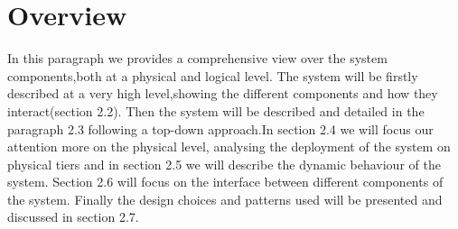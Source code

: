 \section{Overview}
In this paragraph we provides a comprehensive view over the system components,both at a physical and logical level.
The system will be firstly described at a very high level,showing the different components and how they interact(section 2.2). Then the system will be described and detailed in the paragraph 2.3 following a top-down approach.In section 2.4 we will focus our attention more on the physical level, analysing the deployment of the system on physical tiers and in section 2.5 we will describe the dynamic behaviour of the system. Section 2.6 will focus on the interface between different components of the system.
Finally the design choices and patterns used will be presented and discussed in section 2.7.